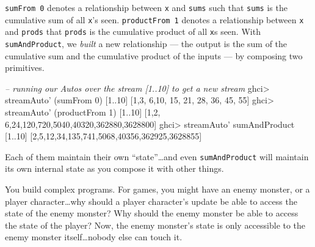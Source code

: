 \documentclass[]{article}
\newenvironment{Shaded}{}{}
\newcommand{\DecValTok}[1]{\textcolor[rgb]{0.25,0.63,0.44}{{#1}}}
\newcommand{\CommentTok}[1]{\textcolor[rgb]{0.38,0.63,0.69}{\textit{{#1}}}}
\newcommand{\FunctionTok}[1]{\textcolor[rgb]{0.02,0.16,0.49}{{#1}}}
\newcommand{\NormalTok}[1]{{#1}}
\begin{document}
\texttt{sumFrom\ 0} denotes a relationship between \texttt{x} and
\texttt{sums} such that \texttt{sums} is the cumulative sum of all
\texttt{x}'s seen. \texttt{productFrom\ 1} denotes a relationship
between \texttt{x} and \texttt{prods} that \texttt{prods} is the
cumulative product of all \texttt{x}s seen. With \texttt{sumAndProduct},
we \emph{built} a new relationship --- the output is the sum of the
cumulative sum and the cumulative product of the inputs --- by composing
two primitives.

\begin{Shaded}
\begin{Highlighting}[]
\CommentTok{-- running our Autos over the stream [1..10] to get a new stream}
\NormalTok{ghci}\FunctionTok{>} \NormalTok{streamAuto' (sumFrom }\DecValTok{0}\NormalTok{) [}\DecValTok{1}\FunctionTok{..}\DecValTok{10}\NormalTok{]}
\NormalTok{[}\DecValTok{1}\NormalTok{,}\DecValTok{3}\NormalTok{, }\DecValTok{6}\NormalTok{,}\DecValTok{10}\NormalTok{, }\DecValTok{15}\NormalTok{, }\DecValTok{21}\NormalTok{,  }\DecValTok{28}\NormalTok{,   }\DecValTok{36}\NormalTok{,    }\DecValTok{45}\NormalTok{,     }\DecValTok{55}\NormalTok{]}
\NormalTok{ghci}\FunctionTok{>} \NormalTok{streamAuto' (productFrom }\DecValTok{1}\NormalTok{) [}\DecValTok{1}\FunctionTok{..}\DecValTok{10}\NormalTok{]}
\NormalTok{[}\DecValTok{1}\NormalTok{,}\DecValTok{2}\NormalTok{, }\DecValTok{6}\NormalTok{,}\DecValTok{24}\NormalTok{,}\DecValTok{120}\NormalTok{,}\DecValTok{720}\NormalTok{,}\DecValTok{5040}\NormalTok{,}\DecValTok{40320}\NormalTok{,}\DecValTok{362880}\NormalTok{,}\DecValTok{3628800}\NormalTok{]}
\NormalTok{ghci}\FunctionTok{>} \NormalTok{streamAuto' sumAndProduct [}\DecValTok{1}\FunctionTok{..}\DecValTok{10}\NormalTok{]}
\NormalTok{[}\DecValTok{2}\NormalTok{,}\DecValTok{5}\NormalTok{,}\DecValTok{12}\NormalTok{,}\DecValTok{34}\NormalTok{,}\DecValTok{135}\NormalTok{,}\DecValTok{741}\NormalTok{,}\DecValTok{5068}\NormalTok{,}\DecValTok{40356}\NormalTok{,}\DecValTok{362925}\NormalTok{,}\DecValTok{3628855}\NormalTok{]}
\end{Highlighting}
\end{Shaded}

Each of them maintain their own ``state''\ldots{}and even
\texttt{sumAndProduct} will maintain its own internal state as you
compose it with other things.

You build complex programs. For games, you might have an enemy monster,
or a player character\ldots{}why should a player character's update be
able to access the state of the enemy monster? Why should the enemy
monster be able to access the state of the player? Now, the enemy
monster's state is only accessible to the enemy monster
itself\ldots{}nobody else can touch it.
\end{document}
